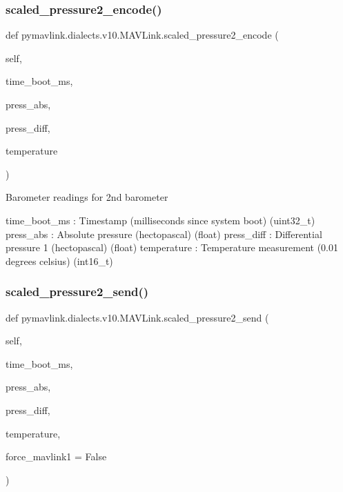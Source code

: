 \begin{DoxyVerb}
\begin{DoxyVerb}
\begin{DoxyVerb}
\begin{DoxyVerb}
\begin{DoxyVerb}
\begin{DoxyVerb}
\begin{DoxyVerb}
\begin{DoxyVerb}
\begin{DoxyVerb}
\begin{DoxyVerb}
\subsubsection{\texorpdfstring{scaled\+\_\+pressure2\+\_\+encode()}{scaled\_pressure2\_encode()}}
{\footnotesize\ttfamily def pymavlink.\+dialects.\+v10.\+M\+A\+V\+Link.\+scaled\+\_\+pressure2\+\_\+encode (\begin{DoxyParamCaption}\item[{}]{self,  }\item[{}]{time\+\_\+boot\+\_\+ms,  }\item[{}]{press\+\_\+abs,  }\item[{}]{press\+\_\+diff,  }\item[{}]{temperature }\end{DoxyParamCaption})}

\begin{DoxyVerb}Barometer readings for 2nd barometer

time_boot_ms              : Timestamp (milliseconds since system boot) (uint32_t)
press_abs                 : Absolute pressure (hectopascal) (float)
press_diff                : Differential pressure 1 (hectopascal) (float)
temperature               : Temperature measurement (0.01 degrees celsius) (int16_t)\end{DoxyVerb}
 \mbox{\label{classpymavlink_1_1dialects_1_1v10_1_1MAVLink_a1c194cd1db3ce31243b328a082718a51}} 
\subsubsection{\texorpdfstring{scaled\+\_\+pressure2\+\_\+send()}{scaled\_pressure2\_send()}}
{\footnotesize\ttfamily def pymavlink.\+dialects.\+v10.\+M\+A\+V\+Link.\+scaled\+\_\+pressure2\+\_\+send (\begin{DoxyParamCaption}\item[{}]{self,  }\item[{}]{time\+\_\+boot\+\_\+ms,  }\item[{}]{press\+\_\+abs,  }\item[{}]{press\+\_\+diff,  }\item[{}]{temperature,  }\item[{}]{force\+\_\+mavlink1 = {\ttfamily False} }\end{DoxyParamCaption})}


\end{DoxyVerb}
\end{DoxyVerb}
\end{DoxyVerb}
\end{DoxyVerb}
\end{DoxyVerb}
\end{DoxyVerb}
\end{DoxyVerb}
\end{DoxyVerb}
\end{DoxyVerb}
\end{DoxyVerb}
